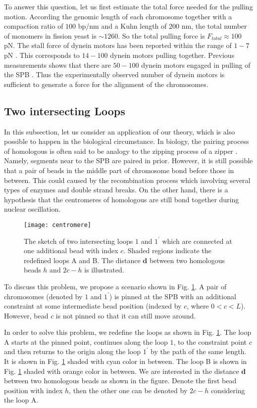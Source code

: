 To answer this question, let us first estimate the total force needed for the pulling motion. According the genomic length of each chromosome together with a compaction ratio of $100$ bp/nm and a Kuhn length of $200$ nm, the total number of monomers in fission yeast is $\sim 1260$. So the total pulling force is $F_{total} \approx 100$ pN. The stall force of dynein motors has been reported within the range of $1-7$ pN \cite{Toba2006,Gennerich2007}. This corresponds to $14-100$ dynein motors pulling together. Previous measurements shows that there are $50-100$ dynein motors engaged in pulling of the SPB \cite{Ananthanarayanan2013}. Thus the experimentally observed number of dynein motors is sufficient to generate a force for the alignment of the chromosomes.  


\subsection{Two intersecting Loops}
\label{sub:two_intersecting_loops}
In this subsection, let us consider an application of our theory, which is also possible to happen in the biological circumstance. In biology, the pairing process of homologous is often said to be analogy to the zipping process of a zipper \cite{Tsai2011}. Namely, segments near to the SPB are paired in prior. However, it is still possible that a pair of beads in the middle part of chromosome bond before those in between. This could caused by the recombination process which involving several types of enzymes and double strand breaks. On the other hand, there is a hypothesis that the centromeres of homologous are still bond together during nuclear oscillation. 
\begin{figure}[htpb]
    \centering
    \texttt{[image: centromere]}
    \caption{The sketch of two intersecting loops $1$ and $1^\prime$ which are connected at one additional bead with index $c$. Shaded regions indicate the redefined loops A and B. The distance $\mathbf{d}$ between two homologous beads $h$ and $2c-h$ is illustrated. }
    \label{fig:centromere}
\end{figure}

To discuss this problem, we propose a scenario shown in Fig. \ref{fig:centromere}. A pair of chromosomes (denoted by $1$ and $1^\prime$) is pinned at the SPB with an additional constraint at some intermediate bead position (indexed by $c$, where $0<c<L$). However, bead $c$ is not pinned so that it can still move around. 

In order to solve this problem, we redefine the loops as shown in Fig. \ref{fig:centromere}. The loop A starts at the pinned point, continues along the loop $1$, to the constraint point $c$ and then returns to the origin along the loop $1^\prime$ by the path of the same length. It is shown in Fig. \ref{fig:centromere} shaded with cyan color in between. The loop B is shown in Fig. \ref{fig:centromere} shaded with orange color in between. We are interested in the distance $\mathbf{d}$ between two homologous beads as shown in the figure. Denote the first bead position with index $h$, then the other one can be denoted by $2c-h$ considering the loop A. 

